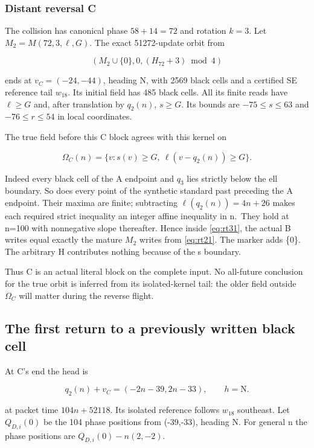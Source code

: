 \subsubsection{Distant reversal C}\label{distant-reversal-c}

The collision has canonical phase $58+14=72$ and rotation $k=3$.
Let $M_2=M(72,3,\ell,G)$. The exact 51272-update orbit from

\[
(M_2\cup\{0\},0,(H_{72}+3)\bmod4)
\]

ends at $v_C=(-24,-44)$, heading N, with 2569 black cells and a certified
SE reference tail $w_{18}$. Its initial field has 485 black cells. All its
finite reads have $\ell\ge G$ and, after translation by $q_2(n)$,
$s\ge G$. Its bounds are $-75\le s\le63$ and
$-76\le r\le54$ in local coordinates.

The true field before this C block agrees with this kernel on

\begin{equation}\label{eq:rt31}
\Omega_C(n)=\{v:s(v)\ge G,\ \ell(v-q_2(n))\ge G\}.
\end{equation}

Indeed every black cell of the A endpoint and $q_3$ lies strictly below the
ell boundary. So does every point of the synthetic standard past
preceding the A endpoint. Their maxima are finite; subtracting
$\ell(q_2(n))=4n+26$ makes each required strict inequality an integer affine
inequality in n.~They hold at n=100 with nonnegative slope thereafter.
Hence inside \eqref{eq:rt31}, the actual B writes equal exactly the mature $M_2$
writes from \eqref{eq:rt21}. The marker adds \{0\}. The arbitrary H contributes
nothing because of the s boundary.

Thus C is an actual literal block on the complete input. No all-future
conclusion for the true orbit is inferred from its isolated-kernel tail:
the older field outside $\Omega_C$ will matter during the reverse flight.

\subsection{The first return to a previously written black cell}\label{returns-4}

At C's end the head is

\begin{equation}\label{eq:rt41}
q_2(n)+v_C=(-2n-39,2n-33),\qquad h=\mathrm N.
\end{equation}

at packet time $104n+52118$. Its isolated reference follows $w_{18}$
southeast. Let $Q_{D,i}(0)$ be the 104 phase positions from (-39,-33),
heading N. For general n the phase positions are $Q_{D,i}(0)-n(2,-2)$.

